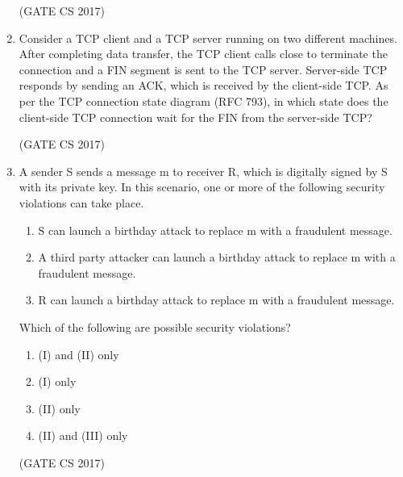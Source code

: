 \documentclass[a4paper, 11pt]{article}
\begin{document}
\begin{enumerate}
    \hfill (GATE CS 2017)
    
    \item Consider a TCP client and a TCP server running on two different machines. After completing data transfer, the TCP client calls close to terminate the connection and a FIN segment is sent to the TCP server. Server-side TCP responds by sending an ACK, which is received by the client-side TCP. As per the TCP connection state diagram (RFC 793), in which state does the client-side TCP connection wait for the FIN from the server-side TCP?
    
    \begin{enumerate}
    \end{enumerate}
    
    \hfill (GATE CS 2017)
    
    \item A sender S sends a message m to receiver R, which is digitally signed by S with its private key. In this scenario, one or more of the following security violations can take place.
    \begin{enumerate}[label=\Roman*]
        \item S can launch a birthday attack to replace m with a fraudulent message.
        \item A third party attacker can launch a birthday attack to replace m with a fraudulent message.
        \item R can launch a birthday attack to replace m with a fraudulent message.
    \end{enumerate}
    Which of the following are possible security violations?
    
    \begin{enumerate}
        \item (I) and (II) only
        \item (I) only
        \item (II) only
        \item (II) and (III) only
    \end{enumerate}
    
    \hfill (GATE CS 2017)
    

\end{enumerate}
\end{document}
